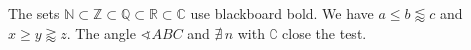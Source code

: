\documentclass{article}
\begin{document}
The sets $\mathbb{N}\subset\mathbb{Z}\subset\mathbb{Q}\subset\mathbb{R}\subset\mathbb{C}$ use blackboard bold.
We have $a\leqslant b\lessapprox c$ and $x\geqslant y\gtrapprox z$.
The angle $\sphericalangle ABC$ and $\nexists\,n$ with $\complement$ close the test.
\end{document}
